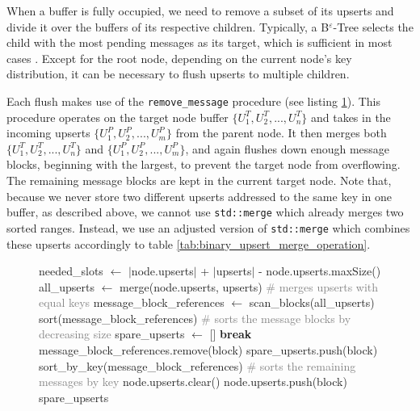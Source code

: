 When a buffer is fully occupied, we need to remove a subset of its upserts and divide it over the buffers of its respective children. Typically, a B$^\varepsilon$-Tree selects the child with the most pending messages as its target, which is sufficient in most cases \cite{b_epsilon_tree}. Except for the root node, depending on the current node's key distribution, it can be necessary to flush upserts to multiple children.

Each flush makes use of the \texttt{remove\_message} procedure (see listing \ref{fig:remove_messages}). This procedure operates on the target node buffer $\{U^T_1, U^T_2, ..., U^T_n\}$ and takes in the incoming upserts $\{U^P_1, U^P_2, ..., U^P_m\}$ from the parent node. It then merges both $\{U^T_1, U^T_2, ..., U^T_n\}$ and $\{U^P_1, U^P_2, ..., U^P_m\}$, and again flushes down enough message blocks, beginning with the largest, to prevent the target node from overflowing. The remaining message blocks are kept in the current target node. Note that, because we never store two different upserts addressed to the same key in one buffer, as described above, we cannot use \texttt{std::merge} which already merges two sorted ranges. Instead, we use an adjusted version of \texttt{std::merge} which combines these upserts accordingly to table \ref{tab:binary_upsert_merge_operation}.

\begin{figure}[h]
	\label{fig:remove_messages}
	\vspace*{5mm}
	\begin{algorithmic}[1]
		\State needed\_slots $\leftarrow$ $|$node.upserts$|$ + $|$upserts$|$ - node.upserts.maxSize()
		\State all\_upserts $\leftarrow$ merge(node.upserts, upserts) \space\textcolor{gray}{\# merges upserts with equal keys}
		\State message\_block\_references $\leftarrow$ scan\_blocks(all\_upserts)
		\State sort(message\_block\_references) \space\textcolor{gray}{\# sorts the message blocks by decreasing size}
		\State spare\_upserts $\leftarrow$ []
		\State \textbf{break}
		\EndIf
		\State message\_block\_references.remove(block)
		\State spare\_upserts.push(block)
		\EndFor
		\State sort\_by\_key(message\_block\_references) \space\textcolor{gray}{\# sorts the remaining messages by key}
		\State node.upserts.clear()
		\State node.upserts.push(block)
		\EndFor
		\State \Return spare\_upserts
		\EndFunction
		\newline
	\end{algorithmic}
\end{figure}

